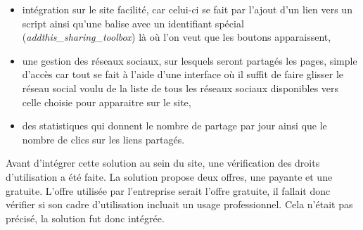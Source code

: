 \documentclass[12pt,a4paper]{article}
\begin{document}
\begin{itemize}
\item intégration sur le site facilité, car celui-ci se fait par l'ajout d'un lien vers un script ainsi qu'une balise avec un identifiant spécial (\textit{addthis\_sharing\_toolbox}) là où l'on veut que les boutons apparaissent,
\item une gestion des réseaux sociaux, sur lesquels seront partagés les pages, simple d'accès car tout se fait à l'aide d'une interface où il suffit de faire glisser le réseau social voulu de la liste de tous les réseaux sociaux disponibles vers celle choisie pour apparaitre sur le site,
\item des statistiques qui donnent le nombre de partage par jour ainsi que le nombre de clics sur les liens partagés.
\end{itemize}\par
Avant d'intégrer cette solution au sein du site, une vérification des droits d'utilisation a été faite. La solution propose deux offres, une payante et une gratuite. L'offre utilisée par l'entreprise serait l'offre gratuite, il fallait donc vérifier si son cadre d'utilisation incluait un usage professionnel. Cela n'était pas précisé, la solution fut donc intégrée.\par
\end{document}
